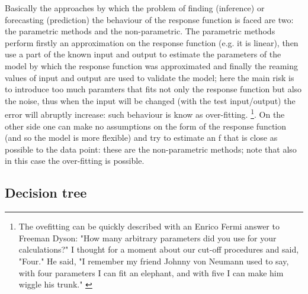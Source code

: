 \documentclass[
12pt, %
a4paper, %
oneside, %
headinclude,footinclude, %
BCOR5mm, %
]{scrartcl}
\begin{document}
Basically the approaches by which the problem of finding (inference) or forecasting (prediction) the behaviour of the response function is faced are two: the parametric methods and the non-parametric. The parametric methods perform firstly an approximation on the response function (e.g. it is linear), then use a part of the known input and output to estimate the parameters of the model by which the response function was approximated and finally the reaming values of input and output are used to validate the model; here the main risk is to introduce too much paramters that fits not only the response function but also the noise, thus when the input will be changed (with the test input/output) the error will abruptly increase: such behaviour is know as over-fitting. \footnote{The ovefitting can be quickly described with an Enrico Fermi answer to Freeman Dyson: "How many arbitrary parameters did you use for your calculations?" I thought for a moment about our cut-off procedures and said, "Four." He said, "I remember my friend Johnny von Neumann used to say, with four parameters I can fit an elephant, and with five I can make him wiggle his trunk." \cite{dyson}}. On the other side one can make no assumptions on the form of the response function (and so the model is more flexible) and try to estimate an f that is close as possible to the data point: these are the non-parametric methods; note that also in this case the over-fitting is possible. 


\clearpage

\subsection{Decision tree}
\end{document}
